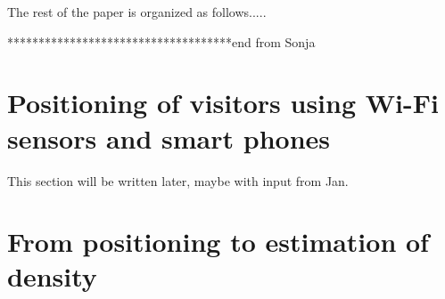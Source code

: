 \documentclass[10pt,a4paper]{article}
\begin{document}
The rest of the paper is organized as follows.....



************************************end from Sonja

\section{Positioning of visitors using Wi-Fi sensors and smart phones}


This section will be written later, maybe with input from Jan.

\section{From positioning to estimation of density}
\end{document}
